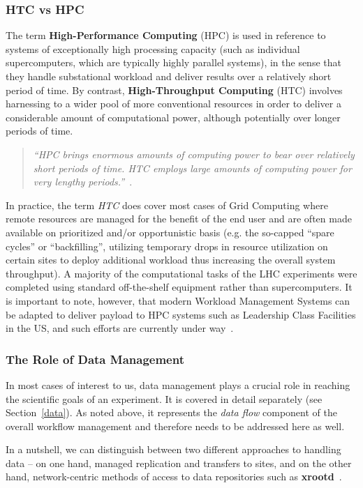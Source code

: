 \subsubsection{HTC vs HPC}
The term \textbf{High-Performance Computing} (HPC) is used in reference to systems of exceptionally high processing capacity (such as individual supercomputers, which are typically highly parallel systems),
in the sense that they handle substational workload and deliver results over a relatively short period of time. By contrast,\textbf{ High-Throughput Computing} (HTC) involves harnessing to a wider pool
of more conventional resources in order to deliver a considerable amount of computational power, although potentially over longer periods of time. 
\begin{quote}
\textit{``HPC brings enormous amounts of computing power to bear over relatively short periods of time. HTC employs large amounts of computing power for very lengthy periods.''}~\cite{htc}.
\end{quote}

In practice, the term \textit{HTC} does cover most cases of Grid Computing where remote resources are managed for the benefit of the end user and are often made available on prioritized and/or
opportunistic basis (e.g. the so-capped ``spare cycles'' or ``backfilling'', utilizing temporary drops in resource utilization on certain sites to deploy additional workload thus increasing the overall system
throughput). A majority of the computational tasks of the LHC experiments were completed using standard off-the-shelf equipment rather than supercomputers. It is important to note, however,
that modern Workload Management Systems can be adapted to deliver payload to HPC systems such as Leadership Class Facilities in the US, and such efforts are currently under way~\cite{panda_chep13}.

\subsubsection{The Role of Data Management}
In most cases of interest to us, data management plays a crucial role in reaching the scientific goals of an experiment. It is covered in detail separately (see Section~\ref{data}).
As noted above, it represents the \textit{data flow} component of the overall workflow management and therefore needs to be addressed here as well.

In a nutshell, we can distinguish between two different approaches to handling data -- on one hand, managed replication and transfers to sites, and on the other hand, network-centric
methods of access to data repositories such as \textbf{xrootd}~\cite{xrootd,xrootd-web}.

